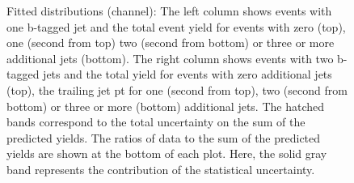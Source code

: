 \begin{figure}[htbp!]
\begin{center}

\caption{Fitted distributions (\ee channel): 
  The left column shows events with one b-tagged jet and the total event yield for events with zero (top), one (second from top)
  two (second from bottom) or three or more additional jets (bottom).
  The right column shows events with two b-tagged jets and the total yield for events with zero additional jets (top),
  the trailing jet pt for one (second from top),
  two (second from bottom) or three or more (bottom) additional jets.
  The hatched bands correspond to the total uncertainty on the sum of
  the predicted yields. The ratios of data to the sum of the
  predicted yields are shown at the bottom of each plot. Here, the solid
  gray band represents the contribution of the statistical uncertainty.  
       \label{fig:lh_ee_postfitdistr8}}
  \end{center}
\end{figure}


